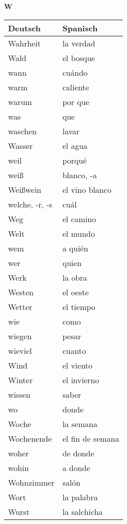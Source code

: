 \begin{flushright}\begin{Huge}\textbf{W}\end{Huge}\end{flushright}

\begin{longtable}{p{} p{}} 
\textbf{Deutsch}     & \textbf{Spanisch}                                       \\ \hline
\hline
\endhead %
Wahrheit & la verdad\\
Wald & el bosque\\
wann & cuándo\\
warm & caliente\\
warum & por que\\
was & que\\
waschen & lavar\\
Wasser & el agua\\
weil & porqué\\
weiß & blanco, -a\\
Weißwein & el vino blanco\\
welche, -r, -s & cuál \\
Weg & el camino\\
Welt & el mundo\\
wem & a quién\\
wer & quien\\
Werk & la obra\\
Westen & el oeste\\
Wetter & el tiempo\\
wie & como\\
wiegen & pesar\\
wieviel & cuanto \\
Wind & el viento\\
Winter & el invierno\\
wissen & saber\\
wo & donde\\
Woche & la semana\\
Wochenende & el fin de semana\\
woher & de donde\\
wohin & a donde\\
Wohnzimmer & salón\\
Wort & la palabra\\
Wurst & la salchicha\\
\end{longtable}
